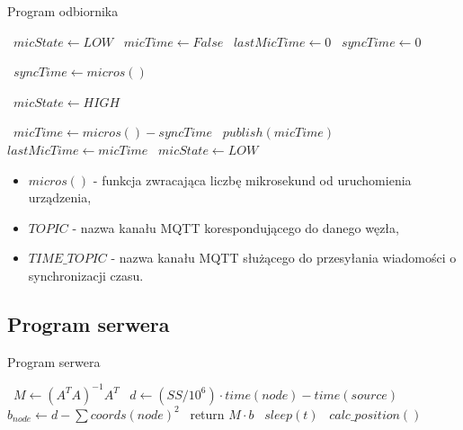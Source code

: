 \begin{algorithm}
\caption{Program odbiornika}\label{alg:sink}
\begin{algorithmic}[1]
    \State\ $micState \gets LOW$
    \State\ $micTime \gets False$
    \State\ $lastMicTime \gets 0$
    \State\ $syncTime \gets 0$

            \State\ $syncTime \gets micros()$
        \EndIf
    \EndFunction

        \State\ $micState \gets HIGH$
    \EndFunction

    \Loop
            \State\ $micTime \gets micros() - syncTime$
            \State\ $publish(micTime)$
            \State\ $lastMicTime \gets micTime$
            \State\ $micState \gets LOW$
        \EndIf
    \EndLoop
\end{algorithmic}
\end{algorithm}

\begin{itemize}
    \item $micros()$ {-} funkcja zwracająca liczbę mikrosekund od uruchomienia urządzenia,
    \item $TOPIC$ {-} nazwa kanału MQTT korespondującego do danego węzła,
    \item $TIME\_TOPIC$ {-} nazwa kanału MQTT służącego do przesyłania wiadomości o synchronizacji czasu.
\end{itemize}

\subsection{Program serwera}

\begin{algorithm}
\caption{Program serwera}\label{alg:server}
\begin{algorithmic}[1]
    \State\ $M \gets {\left(A^T A\right)}^{-1} A^T$
            \State\ $d \gets (SS / 10^{6}) \cdot time(node) - time(source)$
            \State\ $b_{node} \gets d - \sum{coords(node)^2}$
        \EndFor
        \State\ return $M \cdot b$
    \EndFunction
    \Loop
        \State\ $sleep(t)$
        \State\ $calc\_position()$
    \EndLoop
\end{algorithmic}
\end{algorithm}

